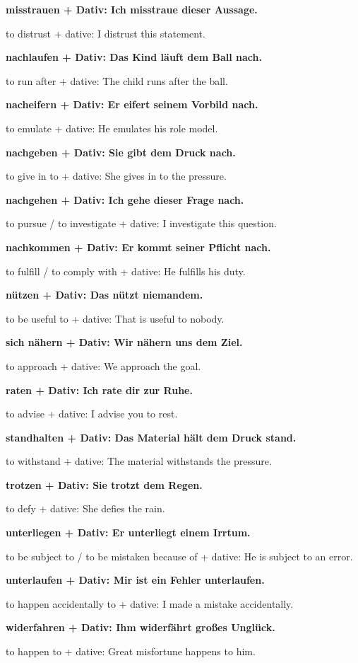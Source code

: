 \documentclass[a4paper]{article}
\newcommand{\EN}[1]{\par{\small\textcolor{TranslationGray}{#1}}\vspace{0.4em}}
\begin{document}
            \textbf{misstrauen + Dativ: Ich misstraue dieser Aussage.}
            \EN{to distrust + dative: I distrust this statement.}
            
            \textbf{nachlaufen + Dativ: Das Kind läuft dem Ball nach.}
            \EN{to run after + dative: The child runs after the ball.}
            
            \textbf{nacheifern + Dativ: Er eifert seinem Vorbild nach.}
            \EN{to emulate + dative: He emulates his role model.}
            
            \textbf{nachgeben + Dativ: Sie gibt dem Druck nach.}
            \EN{to give in to + dative: She gives in to the pressure.}
            
            \textbf{nachgehen + Dativ: Ich gehe dieser Frage nach.}
            \EN{to pursue / to investigate + dative: I investigate this question.}
            
            \textbf{nachkommen + Dativ: Er kommt seiner Pflicht nach.}
            \EN{to fulfill / to comply with + dative: He fulfills his duty.}
            
            \textbf{nützen + Dativ: Das nützt niemandem.}
            \EN{to be useful to + dative: That is useful to nobody.}
            
            \textbf{sich nähern + Dativ: Wir nähern uns dem Ziel.}
            \EN{to approach + dative: We approach the goal.}
            
            \textbf{raten + Dativ: Ich rate dir zur Ruhe.}
            \EN{to advise + dative: I advise you to rest.}
            
            \textbf{standhalten + Dativ: Das Material hält dem Druck stand.}
            \EN{to withstand + dative: The material withstands the pressure.}
            
            \textbf{trotzen + Dativ: Sie trotzt dem Regen.}
            \EN{to defy + dative: She defies the rain.}
            
            \textbf{unterliegen + Dativ: Er unterliegt einem Irrtum.}
            \EN{to be subject to / to be mistaken because of + dative: He is subject to an error.}
            
            \textbf{unterlaufen + Dativ: Mir ist ein Fehler unterlaufen.}
            \EN{to happen accidentally to + dative: I made a mistake accidentally.}
            
            \textbf{widerfahren + Dativ: Ihm widerfährt großes Unglück.}
            \EN{to happen to + dative: Great misfortune happens to him.}
            
\end{document}
